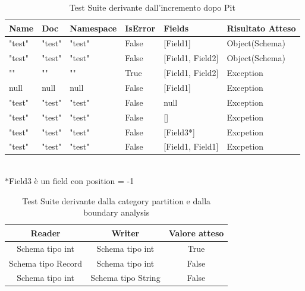 \documentclass[10pt, a4paper]{article}
\begin{document}
\begin{table}[ht]
  \centering
  \caption[CreateRecord: Test Suite - Mutation Testing]{Test Suite derivante dall'incremento dopo Pit}
  \begin{tabular}{|l|l|l|l|l|l|}
    \hline
    \textbf{Name} & \textbf{Doc} & \textbf{Namespace}  & \textbf{IsError} & \textbf{Fields} & \textbf{Risultato Atteso} \\
    \hline
    "test" & "test" & "test" & False & [Field1] & Object(Schema) \\
    "test" & "test" & "test" & False & [Field1, Field2] & Object(Schema) \\
    "" & "" & "" & True & [Field1, Field2] & Exception \\
    null & null & null & False & [Field1] & Exception \\
    "test" & "test" & "test" & False & null & Exception \\
    "test" & "test" & "test" & False & [] & Excpetion \\
    "test" & "test" & "test" & False & [Field3*] & Excpetion \\
    "test" & "test" & "test" & False & [Field1, Field1] & Excpetion \\
    \hline
  \end{tabular}
   \\$\ast$Field3 è un field con position = -1
  \label{tab:PitCreateRecord1}
\end{table}



\begin{table}[ht]
  \centering
  \caption[SchemaCompatibility: Test Suite - Category Partition]{Test Suite derivante dalla category partition e dalla boundary analysis}
  \begin{tabular}{|c|c|c|}
    \hline
    Reader & Writer & Valore atteso \\
    \hline
    Schema tipo int & Schema tipo int & True \\
    Schema tipo Record & Schema tipo int & False \\
    Schema tipo int & Schema tipo String & False \\
    \hline
  \end{tabular}
  \label{tab:TestSuiteSchemaCompatibility}
\end{table}
  
\end{document}
